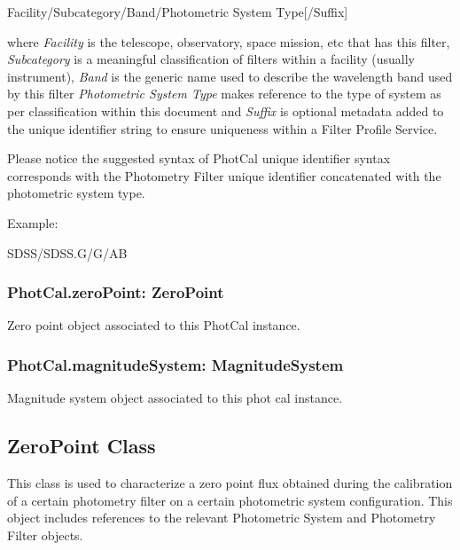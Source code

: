 \documentclass[11pt,a4paper]{ivoa}
\begin{document}
Facility/Subcategory/Band/Photometric System Type[/Suffix]
\bigskip


where \textit{Facility} is the telescope, observatory, space mission, etc that 
has this filter, \textit{Subcategory} is a meaningful classification of filters 
within a facility (usually instrument), \textit{Band} is the generic name used to 
describe the wavelength band used by this filter \textit{Photometric System Type} 
makes reference to the type of system as per classification within this document 
and \textit{Suffix} is optional metadata added to the unique identifier string to 
ensure uniqueness within a Filter Profile Service.
\par

Please notice the suggested syntax of PhotCal unique identifier syntax corresponds 
with the Photometry Filter unique identifier concatenated with the photometric 
system type.
\par

Example:
\par



SDSS/SDSS.G/G/AB
\bigskip




\subsubsection{PhotCal.zeroPoint: ZeroPoint}
Zero point object associated to this PhotCal instance.
\par

\subsubsection{PhotCal.magnitudeSystem: MagnitudeSystem}
Magnitude system object associated to this phot cal instance.
\par

\subsection{ZeroPoint Class}
This class is used to characterize a zero point flux obtained during the 
calibration of a certain photometry filter on a certain photometric system 
configuration. This object includes references to the relevant Photometric 
System and Photometry Filter objects.
\par
\end{document}

